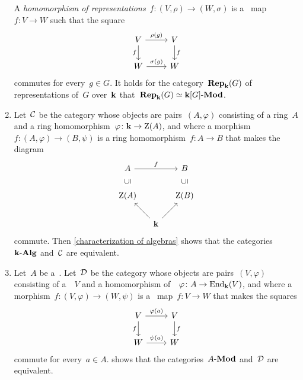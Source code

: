 \begin{example}
\begin{enumerate}
      A \emph{homomorphism of representations}~$f \colon (V, \rho) \to (W,\sigma)$ is a~{\klin} map~$f \colon V \to W$ such that the square
      \[
        \begin{tikzcd}
            V
            \arrow{r}[above]{\rho(g)}
            \arrow{d}[left]{f}
          & V
            \arrow{d}[right]{f}
          \\
            W
            \arrow{r}[above]{\sigma(g)}
          & W
        \end{tikzcd}
      \]
      commutes for every~$g \in G$.
      It holds for the category~$\mathbf{Rep}_{\mathbf{k}}(G)$ of representations of~$G$ over~$\kf$ that~$\mathbf{Rep}_{\mathbf{k}}(G) \simeq \text{$\mathbf{k}[G]$-$\mathbf{Mod}$}$.
    \item
      Let~$\mathcal{C}$ be the category whose objects are pairs~$(A, \varphi)$ consisting of a ring~$A$ and a ring homomorphism~$\varphi \colon \mathbf{k} \to \operatorname{Z}(A)$, and where a morphism~$f \colon (A, \varphi) \to (B, \psi)$ is a ring homomorphism~$f \colon A \to B$ that makes the diagram
      \[
        \begin{tikzcd}[column sep = small]
            A
            \arrow{rr}[above]{f}
          & {}
          & B
          \\
            \ringcenter(A)
            \arrow[phantom]{u}[description, rotate=90]{\subseteq}
          & {}
          & \ringcenter(B)
            \arrow[phantom]{u}[description, rotate=90]{\subseteq}
          \\
            {}
          & \kf
            \arrow{ul}
            \arrow{ur}
          & {}
        \end{tikzcd}
      \]
      commute.
      Then \cref{characterization of algebras} shows that the categories~$\text{$\mathbf{k}$-$\mathbf{Alg}$}$ and~$\mathcal{C}$ are equivalent.
    \item
      Let~$A$ be a~{\kalg}.
      Let~$\mathcal{D}$ be the category whose objects are pairs~$(V, \varphi)$ consisting of a~{\module{$\kf$}}~$V$ and a homomorphism of~{\kalgs}~$\varphi \colon A \to \operatorname{End}_{\mathbf{k}}(V)$, and where a morphism~$f \colon (V,\varphi) \to (W,\psi)$ is a~{\klin} map~$f \colon V \to W$ that makes the squares
      \[
        \begin{tikzcd}
            V
            \arrow{r}[above]{\varphi(a)}
            \arrow{d}[left]{f}
          & V
            \arrow{d}[right]{f}
          \\
            W
            \arrow{r}[above]{\psi(a)}
          & W
        \end{tikzcd}
      \]
      commute for every~$a \in A$.
       shows that the categories~$\text{$A$-$\mathbf{Mod}$}$ and~$\mathcal{D}$ are equivalent.
  \end{enumerate}
\end{example}







